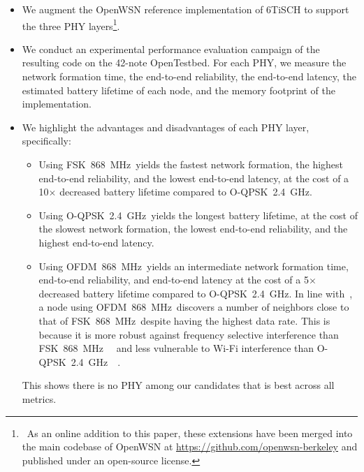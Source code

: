 \documentclass[sensors,article,submit,moreauthors,pdftex]{Definitions/mdpi}
\newcommand{\fsk}           {FSK~868~MHz}
\newcommand{\oqpsk}         {O-QPSK~2.4~GHz}
\newcommand{\ofdm}          {OFDM~868~MHz}
\begin{document}
\begin{itemize}
    \item We augment the OpenWSN reference implementation of 6TiSCH to support the three PHY layers\footnote{~As an online addition to this paper, these extensions have been merged into the main codebase of OpenWSN at \url{https://github.com/openwsn-berkeley} and published under an open-source license.}.
    \item We conduct an experimental performance evaluation campaign of the resulting code on the 42-note OpenTestbed.
        For each PHY, we measure 
            the network formation time,
            the end-to-end reliability,
            the end-to-end latency, 
            the estimated battery lifetime of each node, and
            the memory footprint of the implementation.
    \item We highlight the advantages and disadvantages of each PHY layer, specifically:
        \begin{itemize}
            \item Using \fsk\ yields
                the fastest network formation,
                the highest end-to-end reliability, and
                the lowest end-to-end latency,
                    at the cost of
                        a 10$\times$ decreased battery lifetime compared to \oqpsk.
            \item Using \oqpsk\ yields
                the longest battery lifetime,
                    at the cost of
                        the slowest network formation,
                        the lowest end-to-end reliability, and
                        the highest end-to-end latency.
            \item Using \ofdm\ yields
                an intermediate network formation time,
                end-to-end reliability, and
                end-to-end latency
                    at the cost of
                        a 5$\times$ decreased battery lifetime compared to \oqpsk.
                In line with~\cite{munoz18evaluation}, a node using \ofdm\ discovers a number of neighbors close to that of \fsk\ despite having the highest data rate. 
                    This is because it is more robust against frequency selective interference than \fsk\ ~\cite{kojima15system} and less vulnerable to Wi-Fi interference than \oqpsk\ ~\cite{munoz18overview}.
        \end{itemize}
        This shows there is no PHY among our candidates that is best across all metrics.
\end{itemize}
\end{document}
